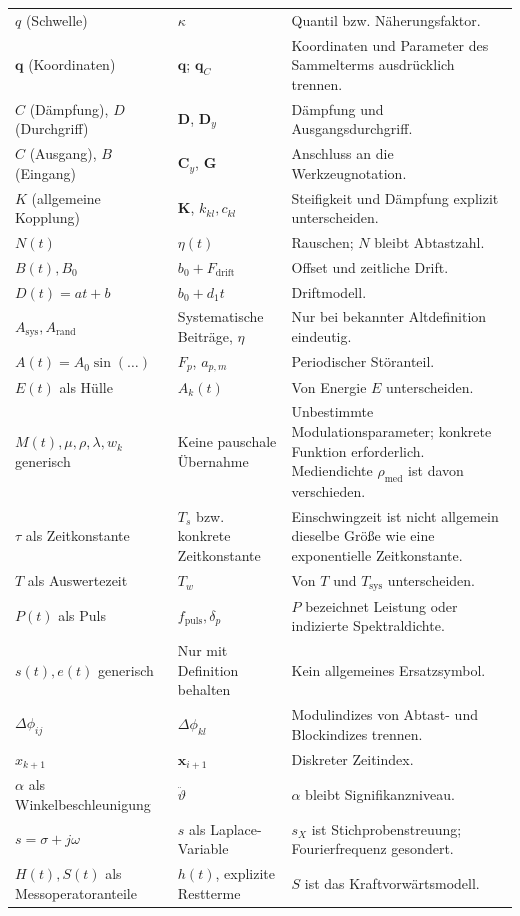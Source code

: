 \documentclass[11pt,a4paper]{article}
\begin{document}
\begin{longtable}{@{}L{.27\textwidth}L{.28\textwidth}L{.40\textwidth}@{}}
$q$ (Schwelle)&$\kappa$&Quantil bzw. Näherungsfaktor.\\
$\mathbf q$ (Koordinaten)&$\mathbf q$; $\mathbf q_C$&Koordinaten und Parameter des Sammelterms ausdrücklich trennen.\\
$C$ (Dämpfung), $D$ (Durchgriff)&$\mathbf D$, $\mathbf D_y$&Dämpfung und Ausgangsdurchgriff.\\
$C$ (Ausgang), $B$ (Eingang)&$\mathbf C_y$, $\mathbf G$&Anschluss an die Werkzeugnotation.\\
$K$ (allgemeine Kopplung)&$\mathbf K$, $k_{kl},c_{kl}$&Steifigkeit und Dämpfung explizit unterscheiden.\\
$N(t)$&$\eta(t)$&Rauschen; $N$ bleibt Abtastzahl.\\
$B(t),B_0$&$b_0+F_{\mathrm{drift}}$&Offset und zeitliche Drift.\\
$D(t)=at+b$&$b_0+d_1t$&Driftmodell.\\
$A_{\mathrm{sys}},A_{\mathrm{rand}}$&Systematische Beiträge, $\eta$&Nur bei bekannter Altdefinition eindeutig.\\
$A(t)=A_0\sin(\ldots)$&$F_p$, $a_{p,m}$&Periodischer Störanteil.\\
$E(t)$ als Hülle&$A_k(t)$&Von Energie $E$ unterscheiden.\\
$M(t),\mu,\rho,\lambda,w_k$ generisch&Keine pauschale Übernahme&Unbestimmte Modulationsparameter; konkrete Funktion erforderlich. Mediendichte $\rho_{\mathrm{med}}$ ist davon verschieden.\\
$\tau$ als Zeitkonstante&$T_s$ bzw. konkrete Zeitkonstante&Einschwingzeit ist nicht allgemein dieselbe Größe wie eine exponentielle Zeitkonstante.\\
$T$ als Auswertezeit&$T_w$&Von $T$ und $T_{\mathrm{sys}}$ unterscheiden.\\
$P(t)$ als Puls&$f_{\mathrm{puls}},\delta_p$&$P$ bezeichnet Leistung oder indizierte Spektraldichte.\\
$s(t),e(t)$ generisch&Nur mit Definition behalten&Kein allgemeines Ersatzsymbol.\\
$\Delta\phi_{ij}$&$\Delta\phi_{kl}$&Modulindizes von Abtast- und Blockindizes trennen.\\
$x_{k+1}$&$\mathbf x_{i+1}$&Diskreter Zeitindex.\\
$\alpha$ als Winkelbeschleunigung&$\ddot\vartheta$&$\alpha$ bleibt Signifikanzniveau.\\
$s=\sigma+j\omega$&$s$ als Laplace-Variable&$s_X$ ist Stichprobenstreuung; Fourierfrequenz gesondert.\\
$H(t),S(t)$ als Messoperatoranteile&$h(t)$, explizite Restterme&$S$ ist das Kraftvorwärtsmodell.\\

\end{longtable}
\end{document}
